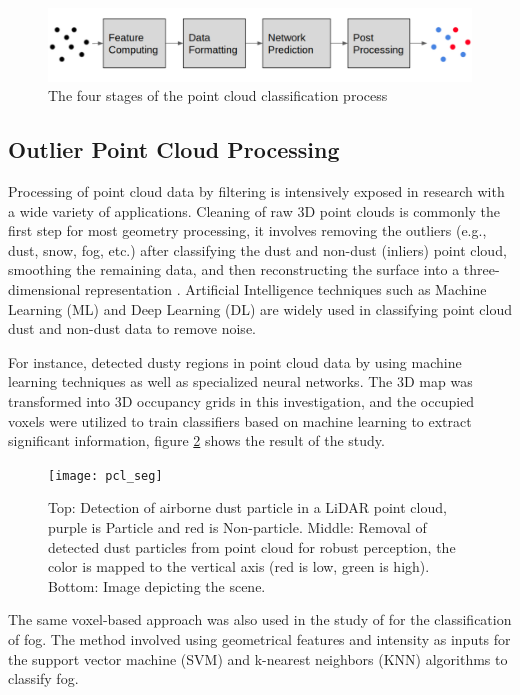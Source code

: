 \begin{figure}[H]
    \centering
    \includegraphics[width=\textwidth]{Figures/four-stage-of-pc-classification-process.png}
    \caption{The four stages of the point cloud classification process}
    \label{fig:The-four-stages-of-the-point-cloud-classification-process}
\end{figure}

\subsection{Outlier Point Cloud Processing}
\label{sub:Point Cloud Processing}
Processing of point cloud data by filtering is intensively exposed in research with a wide variety of applications. Cleaning of raw 3D point clouds is commonly the first step for most geometry processing, it involves removing the outliers (e.g., dust, snow, fog, etc.) after classifying the dust and non-dust (inliers) point cloud, smoothing the remaining data, and then reconstructing the surface into a three-dimensional representation \citep{rakotosaona2020}. Artificial Intelligence techniques such as Machine Learning (ML) and Deep Learning (DL) are widely used in classifying point cloud dust and non-dust data to remove noise.

For instance, \citet{stanislas2018} detected dusty regions in point cloud data by using machine learning techniques as well as specialized neural networks. The 3D map was transformed into 3D occupancy grids in this investigation, and the occupied voxels were utilized to train classifiers based on machine learning to extract significant information, figure \ref{fig:pcl seg} shows the result of the study.

\begin{figure}[H]
    \centering
    \texttt{[image: pcl\_seg]}
    \caption{Top: Detection of airborne dust particle in a LiDAR point cloud, purple is Particle and red is Non-particle. Middle: Removal of detected dust particles from point cloud for robust perception, the color is mapped to the vertical axis (red is low, green is high). Bottom: Image depicting the scene.}
    \label{fig:pcl seg}
\end{figure}

The same voxel-based approach was also used in the study of \citet{shamsudin2016} for the classification of fog. The method involved using geometrical features and intensity as inputs for the support vector machine (SVM) and k-nearest neighbors (KNN) algorithms to classify fog.

